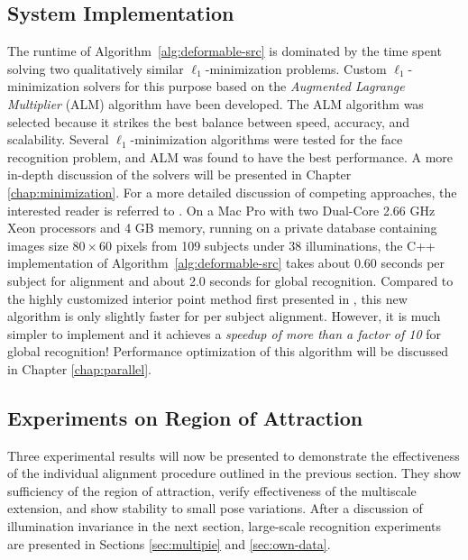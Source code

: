 \subsection{System Implementation}
\label{sec:pipeline_implementation}
The runtime of Algorithm~\ref{alg:deformable-src} is dominated
by the time spent solving two qualitatively similar $\ell_1$-minimization problems.
Custom $\ell_1$-minimization solvers for this purpose based on the
\emph{Augmented Lagrange Multiplier} (ALM) algorithm have been developed.
The ALM algorithm was selected because it strikes the best
balance between speed, accuracy, and scalability.  Several $\ell_1$-minimization
algorithms were tested for the face recognition problem, 
and ALM was found to have the best performance. 
A more in-depth discussion of the solvers will be presented
in Chapter \ref{chap:minimization}.
For a more detailed discussion of competing
approaches, the interested reader is referred to
\cite{YangA2010-pp}.
On a Mac Pro with
two Dual-Core 2.66 GHz Xeon processors and 4 GB memory,
running on a private database containing images size $80\times 60$
pixels from 109 subjects under 38 illuminations,
the C++ implementation of Algorithm~\ref{alg:deformable-src} takes
about 0.60 seconds per subject for alignment and about 2.0
seconds for global recognition. Compared to the highly
customized interior point method first presented in 
\cite{WagnerA2009-CVPR}, this new algorithm is
only slightly faster for per subject alignment. However, it is
much simpler to implement and it achieves a
\emph{speedup of more than a factor of 10} for global
recognition!  Performance optimization of this algorithm
will be discussed in Chapter \ref{chap:parallel}.

\subsection{Experiments on Region of Attraction} Three experimental results
will now be presented to demonstrate the effectiveness of the individual
alignment procedure outlined in the previous section. They show sufficiency of
the region of attraction, verify effectiveness of the multiscale extension, and
show stability to small pose variations.  After a discussion of illumination
invariance in the next section, large-scale recognition experiments are
presented in Sections \ref{sec:multipie} and \ref{sec:own-data}.

